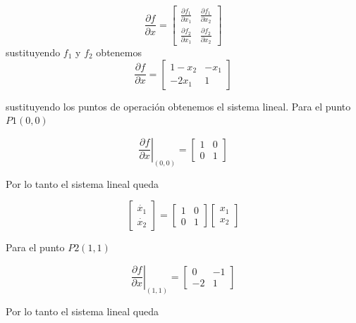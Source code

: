 \documentclass[12pt]{book}
\theoremstyle{definition}
\theoremstyle{remark}
\theoremstyle{plain}
\begin{document}
\begin{equation}
  \frac{\partial f}{\partial x}   =
\begin{bmatrix}
\frac{\partial f_1}{\partial x_1} & \frac{\partial f_1}{\partial x_2}\\
\frac{\partial f_2}{\partial x_1} & \frac{\partial f_2}{\partial x_2}
\end{bmatrix}
\end{equation}
 sustituyendo $f_1$ y $f_2$ obtenemos
\begin{equation}
\label{equ239}
  \frac{\partial f}{\partial x} =
\begin{bmatrix}
1-x_2 & -x_1\\
-2 x_1 & 1
\end{bmatrix}
\end{equation}

sustituyendo los puntos de operación obtenemos el sistema lineal. Para el punto $P1(0,0)$ 

\begin{equation}
\label{equ239}
 \left .  \frac{\partial f}{\partial x} \right |_{(0,0)} =
\begin{bmatrix}
1 & 0\\
0 & 1
\end{bmatrix}
\end{equation}

Por lo tanto el sistema lineal queda

\begin{equation}
\label{equ240}
 \begin{bmatrix}
\dot{x_1}\\
\dot{x_2}
\end{bmatrix}=
\begin{bmatrix}
1 & 0\\
0 & 1
\end{bmatrix}
 \begin{bmatrix}
x_1\\
x_2
\end{bmatrix}
\end{equation}

Para el punto $P2(1,1)$ 

\begin{equation}
\label{equ239}
 \left .  \frac{\partial f}{\partial x} \right |_{(1,1)} =
\begin{bmatrix}
0 & -1\\
-2 & 1
\end{bmatrix}
\end{equation}

Por lo tanto el sistema lineal queda
\end{document}
